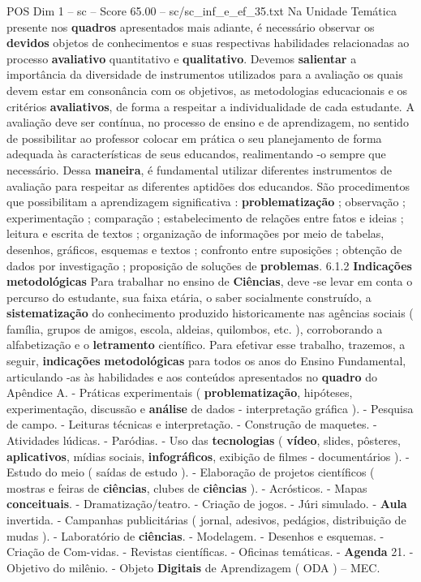 \begin{textsample}{POS Dim 1 – sc – Score 65.00 – sc/sc\_inf\_e\_ef\_35.txt}
Na Unidade Temática presente nos \textbf{quadros} apresentados mais adiante, é necessário observar os \textbf{devidos} objetos de conhecimentos e suas respectivas habilidades relacionadas ao processo \textbf{avaliativo} quantitativo e \textbf{qualitativo}.
Devemos \textbf{salientar} a importância da diversidade de instrumentos utilizados para a avaliação os quais devem estar em consonância com os objetivos, as metodologias educacionais e os critérios \textbf{avaliativos}, de forma a respeitar a individualidade de cada estudante.
A avaliação deve ser contínua, no processo de ensino e de aprendizagem, no sentido de possibilitar ao professor colocar em prática o seu planejamento de forma adequada às características de seus educandos, realimentando -o sempre que necessário.
Dessa \textbf{maneira}, é fundamental utilizar diferentes instrumentos de avaliação para respeitar as diferentes aptidões dos educandos.
São procedimentos que possibilitam a aprendizagem significativa : \textbf{problematização} ; observação ; experimentação ; comparação ; estabelecimento de relações entre fatos e ideias ; leitura e escrita de textos ; organização de informações por meio de tabelas, desenhos, gráficos, esquemas e textos ; confronto entre suposições ; obtenção de dados por investigação ; proposição de soluções de \textbf{problemas}. 6.1.2 \textbf{Indicações} \textbf{metodológicas} Para trabalhar no ensino de \textbf{Ciências}, deve -se levar em conta o percurso do estudante, sua faixa etária, o saber socialmente construído, a \textbf{sistematização} do conhecimento produzido historicamente nas agências sociais ( família, grupos de amigos, escola, aldeias, quilombos, etc. ), corroborando a alfabetização e o \textbf{letramento} científico.
Para efetivar esse trabalho, trazemos, a seguir, \textbf{indicações} \textbf{metodológicas} para todos os anos do Ensino Fundamental, articulando -as às habilidades e aos conteúdos apresentados no \textbf{quadro} do Apêndice A. - Práticas experimentais ( \textbf{problematização}, hipóteses, experimentação, discussão e \textbf{análise} de dados - interpretação gráfica ). - Pesquisa de campo. - Leituras técnicas e interpretação. - Construção de maquetes. - Atividades lúdicas. - Paródias. - Uso das \textbf{tecnologias} ( \textbf{vídeo}, slides, pôsteres, \textbf{aplicativos}, mídias sociais, \textbf{infográficos}, exibição de filmes - documentários ). - Estudo do meio ( saídas de estudo ). - Elaboração de projetos científicos ( mostras e feiras de \textbf{ciências}, clubes de \textbf{ciências} ). - Acrósticos. - Mapas \textbf{conceituais}. - Dramatização/teatro. - Criação de jogos. - Júri simulado. - \textbf{Aula} invertida. - Campanhas publicitárias ( jornal, adesivos, pedágios, distribuição de mudas ). - Laboratório de \textbf{ciências}. - Modelagem. - Desenhos e esquemas. - Criação de Com-vidas. - Revistas científicas. - Oficinas temáticas. - \textbf{Agenda} 21. - Objetivo do milênio. - Objeto \textbf{Digitais} de Aprendizagem ( ODA ) – MEC.


\end{textsample}
